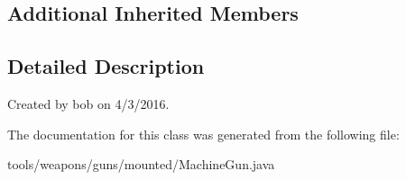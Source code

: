 \subsection*{Additional Inherited Members}


\subsection{Detailed Description}
Created by bob on 4/3/2016. 

The documentation for this class was generated from the following file\+:\begin{DoxyCompactItemize}
\item 
tools/weapons/guns/mounted/Machine\+Gun.\+java\end{DoxyCompactItemize}
